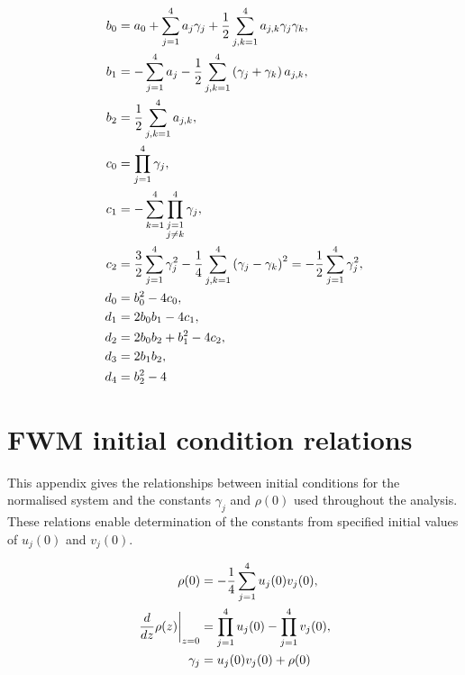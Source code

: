 \documentclass[11pt,a4paper]{article}
\begin{document}
\begin{align}
{b}_{0} &= {a}_{0} + \sum_{j=1}^{4} {a}_{j} {\gamma}_{j} + \frac{1}{2}\sum\limits_{j,k=1}^{4} {a}_{j,k} {\gamma}_{j} {\gamma}_{k}, \notag \\
{b}_{1} &= - \sum_{j=1}^{4} {a}_{j} - \frac{1}{2}\sum\limits_{j,k=1}^{4} \left({\gamma}_{j} + {\gamma}_{k}\right) {a}_{j,k}, \notag \\
{b}_{2} &= \frac{1}{2}\sum\limits_{j,k=1}^{4} {a}_{j,k}, \notag \\
{c}_{0} &= \prod_{j=1}^{4} {\gamma}_{j}, \notag \\
{c}_{1} &= - \sum_{k=1}^{4} \prod_{\substack{j=1 \\ j \ne k}}^{4} {\gamma}_{j}, \notag \\
{c}_{2} &= \frac{3}{2} \sum_{j=1}^{4} {\gamma}_{j}^{2} - \frac{1}{4}\sum\limits_{j,k=1}^{4} \left({\gamma}_{j} - {\gamma}_{k}\right)^{2} = - \frac{1}{2}\sum_{j=1}^{4} {\gamma}_{j}^{2}, \notag \\
{d}_{0} &= {b}_{0}^{2} - 4 {c}_{0}, \notag \\
{d}_{1} &= 2 {b}_{0} {b}_{1} - 4 {c}_{1}, \notag \\
{d}_{2} &= 2 {b}_{0} {b}_{2} + {b}_{1}^{2} - 4 {c}_{2}, \notag \\
{d}_{3} &= 2 {b}_{1} {b}_{2}, \notag \\
{d}_{4} &= {b}_{2}^{2} - 4
\end{align}


\section{FWM initial condition relations}
\label{app:init-conds}

This appendix gives the relationships between initial conditions for the normalised system and the constants $\gamma_j$ and $\rho(0)$ used throughout the analysis.
These relations enable determination of the constants from specified initial values of $u_j(0)$ and $v_j(0)$.

\begin{align}
\rho{\left(0 \right)} &= - \frac{1}{4}\sum_{j=1}^{4} u_j{\left(0 \right)} v_j{\left(0 \right)}, \notag \\
\left. \frac{d}{d z} \rho{\left(z \right)} \right|_{\substack{ z=0 }} &= \prod_{j=1}^{4} u_j(0) - \prod_{j=1}^{4} v_j(0), \notag \\
{\gamma}_{j} &= u_j{\left(0\right)} v_j{\left(0 \right)} + \rho{\left(0 \right)}
\end{align}
\end{document}
